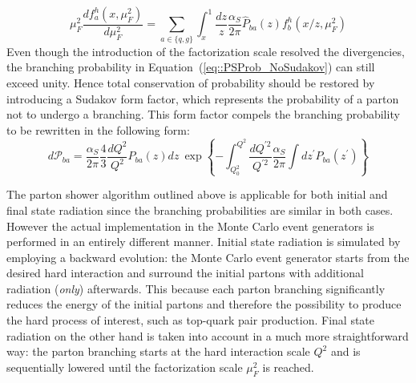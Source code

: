 \begin{equation}\label{eq::PSProb_NoSudakov}
 \mu_{F}^2 \dfrac{d f_{a}^{h}(x,\mu_{F}^{2})}{d \mu_{F}^{2}} = \sum_{a \in \{q,g\} } \int_{x}^{1} \dfrac{dz}{z} \dfrac{\alpha_{S}}{2 \pi} \hat{P}_{ba}(z) f_{b}^{h}(x/z, \mu_{F}^{2})
\end{equation}
Even though the introduction of the factorization scale resolved the divergencies, the branching probability in Equation~(\ref{eq::PSProb_NoSudakov}) can still exceed unity. Hence total conservation of probability should be restored by introducing a Sudakov form factor, which represents the probability of a parton not to undergo a branching. 
This form factor compels the branching probability to be rewritten in the following form:
\begin{equation}
 d\mathcal{P}_{ba} = \dfrac{\alpha_{S}}{2\pi} \dfrac{4}{3} \dfrac{dQ^{2}}{Q^{2}} P_{ba}(z)dz ~ \exp \left\lbrace - \int_{Q_{0}^{2}}^{Q^{2}} \dfrac{dQ^{'2}}{Q^{'2}} \dfrac{\alpha_{S}}{2\pi} \int dz^{'} P_{ba}(z^{'})  \right\rbrace
\end{equation}


The parton shower algorithm outlined above is applicable for both initial and final state radiation since the branching probabilities are similar in both cases. However the actual implementation in the Monte Carlo event generators is performed in an entirely different manner. 
Initial state radiation is simulated by employing a backward evolution: the Monte Carlo event generator starts from the desired hard interaction and surround the initial partons with additional radiation (\textit{only}) afterwards. This because each parton branching significantly reduces the energy of the initial partons and therefore the possibility to produce the hard process of interest, such as top-quark pair production. 
Final state radiation on the other hand is taken into account in a much more straightforward way: the parton branching starts at the hard interaction scale $Q^{2}$ and is sequentially lowered until the factorization scale $\mu_{F}^{2}$ is reached.


